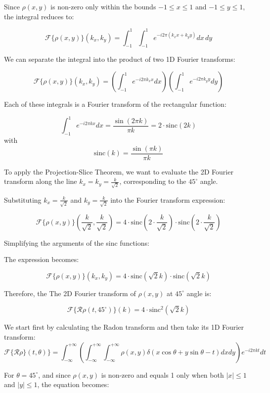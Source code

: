 \documentclass[12pt,twoside]{article}
\begin{document}
\begin{enumerate}
Since $\rho(x,y)$ is non-zero only within the bounds $-1 \leq x \leq 1$ and $-1 \leq y \leq 1$, the integral reduces to:

\[
\mathcal{F}\{\rho(x,y)\}(k_x, k_y) = \int_{-1}^{1} \int_{-1}^{1} e^{-i 2\pi(k_x x + k_y y)} dx\, dy
\]

We can separate the integral into the product of two 1D Fourier transforms:

\[
\mathcal{F}\{\rho(x,y)\}(k_x, k_y) = \left(\int_{-1}^{1} e^{-i 2\pi k_x x} dx\right) \left(\int_{-1}^{1} e^{-i 2\pi k_y y} dy\right)
\]

Each of these integrals is a Fourier transform of the rectangular function:

\[
\int_{-1}^{1} e^{-i 2\pi k x} dx = \frac{\sin(2\pi k)}{\pi k} = 2 \cdot \text{sinc}(2k)
\]
with 
\[
 \text{sinc}(k) = \frac{\sin(\pi k)}{\pi k}
\]

To apply the Projection-Slice Theorem, we want to evaluate the 2D Fourier transform along the line \( k_x = k_y = \frac{k}{\sqrt{2}} \), corresponding to the \(45^\circ\) angle.


Substituting \( k_x = \frac{k}{\sqrt{2}} \) and \( k_y = \frac{k}{\sqrt{2}} \) into the Fourier transform expression:

\[
\mathcal{F}\{\rho(x, y)\}\left(\frac{k}{\sqrt{2}}, \frac{k}{\sqrt{2}}\right) = 4 \cdot \text{sinc}\left(2 \cdot \frac{k}{\sqrt{2}}\right) \cdot \text{sinc}\left(2 \cdot \frac{k}{\sqrt{2}}\right)
\]

Simplifying the arguments of the sinc functions:

The expression becomes:

\[
\mathcal{F}\{\rho(x, y)\}(k_x, k_y) = 4 \cdot \text{sinc}\left(\sqrt{2} k\right) \cdot \text{sinc}\left(\sqrt{2} k\right)
\]

Therefore, the The 2D Fourier transform of $\rho(x,y)$  at \(45^\circ\) angle is:

\[
\mathcal{F}\{\mathcal{R}\rho(t, 45^\circ)\}(k) = 4 \cdot  \text{sinc}^2\left(\sqrt{2} k\right) 
\]

We start first by calculating the Radon transform and then take its 1D Fourier transform:
\[
    \mathcal{F}\{ \mathcal{R} \rho \}(t, \theta) \}  =  \int_{-\infty}^{+\infty}  \left(  \int_{-\infty}^{+\infty} \int_{-\infty}^{+\infty} \rho(x, y) \delta(x \cos \theta + y \sin \theta - t) dx dy \right) e^{-i 2\pi k t} dt
\]

For \(\theta = 45^\circ\), and since \(\rho(x, y)\) is non-zero and equals 1 only when both \(|x| \leq 1\) and \(|y| \leq 1\), the equation becomes:


\end{enumerate}
\end{document}

